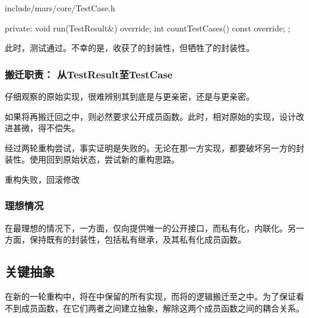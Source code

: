 \begin{content}
\begin{nodiff}{include/mars/core/TestCase.h}
\begin{c++}
{private:
  void run(TestResult&) override;
  int countTestCases() const override;
};
 \end{c++}
\end{nodiff}

此时，测试通过。不幸的是，收获了的封装性，但牺牲了的封装性。

\subsubsection{搬迁职责： 从TestResult至TestCase}

仔细观察的原始实现，很难辨别其到底是与更亲密，还是与更亲密。

如果将再搬迁回之中，则必然要求公开成员函数。此时，相对原始的实现，设计改进甚微，得不偿失。

经过两轮重构尝试，事实证明是失败的。无论在那一方实现，都要破坏另一方的封装性。使用回到原始状态，尝试新的重构思路。

\begin{nodiff}{重构失败，回滚修改}
\end{nodiff}

\subsubsection{理想情况}

在最理想的情况下，一方面，仅向提供唯一的公开接口，而私有化，内联化。另一方面，保持既有的封装性，包括私有继承，及其私有化成员函数。

\subsection{关键抽象}

在新的一轮重构中，将在中保留的所有实现，而将的逻辑搬迁至之中。为了保证看不到成员函数，在它们两者之间建立抽象，解除这两个成员函数之间的耦合关系。


\end{content}
